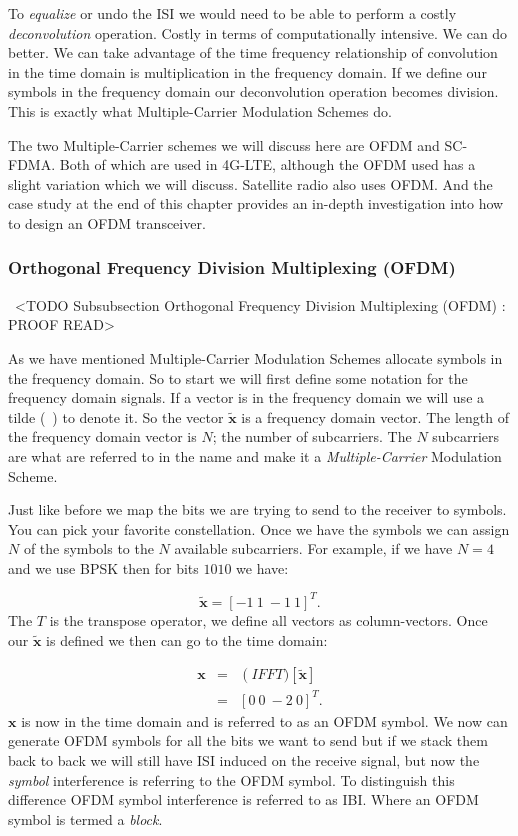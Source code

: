 To \emph{equalize} or undo the \ac{ISI} we would need to be able to perform a costly \emph{deconvolution} operation. Costly in terms of computationally intensive. We can do better. We can take advantage of the time frequency relationship of convolution in the time domain is multiplication in the frequency domain. If we define our symbols in the frequency domain our deconvolution operation becomes division. This is exactly what Multiple-Carrier Modulation Schemes do.

The two Multiple-Carrier schemes we will discuss here are \ac{OFDM} and \ac{SC-FDMA}. Both of which are used in \ac{4G-LTE}, although the \ac{OFDM} used has a slight variation which we will discuss. Satellite radio also uses \ac{OFDM}. And the case study at the end of this chapter provides an in-depth investigation into how to design an \ac{OFDM} transceiver.

\subsubsection{Orthogonal Frequency Division Multiplexing (OFDM)}
 <TODO Subsubsection Orthogonal Frequency Division Multiplexing (OFDM) : PROOF READ>

As we have mentioned Multiple-Carrier Modulation Schemes allocate symbols in the frequency domain. So to start we will first define some notation for the frequency domain signals. If a vector is in the frequency domain we will use a tilde (~) to denote it. So the vector $\tilde{\mathbf{x}}$ is a frequency domain vector. The length of the frequency domain vector is $N$; the number of subcarriers. The $N$ subcarriers are what are referred to in the name and make it a \emph{Multiple-Carrier} Modulation Scheme.

Just like before we map the bits we are trying to send to the receiver to symbols. You can pick your favorite constellation. Once we have the symbols we can assign $N$ of the symbols to the $N$ available subcarriers. For example, if we have $N=4$ and we use \ac{BPSK} then for bits $1010$ we have:

\begin{equation}
\tilde{\mathbf{x}} = [-1~1~-1~1]^T.
\end{equation} 
\noindent
The $T$ is the transpose operator, we define all vectors as column-vectors. Once our $\tilde{\mathbf{x}}$ is defined we then can go to the time domain:

\begin{eqnarray}
\mathbf{x} &=& \operatorname(IFFT)\left[\tilde{\mathbf{x}}\right]\\
&=& [0~0~-2~0]^T.
\label{eq:ofdmtime}
\end{eqnarray}
\noindent
$\mathbf{x}$ is now in the time domain and is referred to as an \ac{OFDM} symbol. We now can generate \ac{OFDM} symbols for all the bits we want to send but if we stack them back to back we will still have \ac{ISI} induced on the receive signal, but now the \emph{symbol} interference is referring to the \ac{OFDM} symbol. To distinguish this difference \ac{OFDM} symbol interference is referred to as \ac{IBI}. Where an \ac{OFDM} symbol is termed a \emph{block}.

